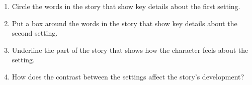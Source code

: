 \documentclass[12pt]{article}
\begin{document}
\begin{tcolorbox}[colframe=black!60, colback=white, 
coltitle=black, colbacktitle=black!15, fonttitle=\bfseries\Large, 
title=Guided Practice, halign title=center, left=10pt, right=10pt, top=10pt, bottom=15pt]

\begin{enumerate}[itemsep=1em]
    \item Circle the words in the story that show key details about the first setting.
    \item Put a box around the words in the story that show key details about the second setting.
    \item Underline the part of the story that shows how the character feels about the setting.
    \item How does the contrast between the settings affect the story's development?
    \\[0.8cm] \underline{\hspace{14cm}}  
    \\[0.8cm] \underline{\hspace{14cm}}  
    
\end{enumerate}
\end{tcolorbox}
\vspace{1em}
\end{document}

